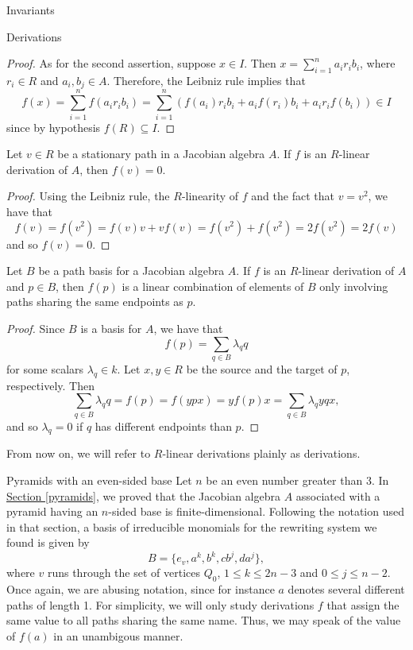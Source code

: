 \begin{chapter}{Invariants}
\begin{section}{Derivations}
\begin{proof}
As for the second assertion, suppose $x\in I$. Then $x=\sum_{i=1}^n a_ir_ib_i$, where $r_i\in R$ and $a_i, b_j\in A$. Therefore, the Leibniz rule implies that
\[f(x) = \sum_{i=1}^n f(a_ir_ib_i)=\sum_{i=1}^n \left(f(a_i)r_ib_i + a_if(r_i)b_i + a_ir_if(b_i)\right)\in I\]
since by hypothesis $f(R)\subseteq I$.
\end{proof}
\begin{obs}\label{derivation-vertices} Let $v\in R$ be a stationary path in a Jacobian algebra $A$. If $f$ is an $R$-linear derivation of $A$, then $f(v)=0$.
\end{obs}
\begin{proof} Using the Leibniz rule, the $R$-linearity of $f$ and the fact that $v=v^2$, we have that
\[f(v)= f(v^2)= f(v)v + vf(v)=f(v^2)+ f(v^2)=2f(v^2)=2f(v)\]
and so $f(v)=0$.
\end{proof}
\begin{obs}\label{endpoints} Let $B$ be a path basis for a Jacobian algebra $A$. If $f$ is an $R$-linear derivation of $A$ and $p\in B$, then $f(p)$ is a linear combination of elements of $B$ only involving paths sharing the same endpoints as $p$.
\end{obs}
\begin{proof} Since $B$ is a basis for $A$, we have that
\[f(p) = \sum_{q\in B} \lambda_q q\]
for some scalars $\lambda_q\in k$. Let $x, y\in R$ be the source and the target of $p$, respectively. Then
\[\sum_{q\in B} \lambda_q q=f(p)=f(ypx) = yf(p)x =\sum_{q\in B} \lambda_q yqx,\]
and so $\lambda_q=0$ if $q$ has different endpoints than $p$.
\end{proof}
From now on, we will refer to $R$-linear derivations plainly as derivations.
\begin{subsection}{Pyramids with an even-sided base}
Let $n$ be an even number greater than 3. In \hyperref[pyramids]{Section \ref*{pyramids}}, we proved that the Jacobian algebra $A$ associated with a pyramid having an $n$-sided base is finite-dimensional. Following the notation used in that section, a basis of irreducible monomials for the rewriting system we found is given by
\[B=\{e_v,a^k,b^k,cb^j, da^j\},\] 
where $v$ runs through the set of vertices $Q_0$, $1\leq k\leq 2n-3$ and $0\leq j\leq n-2$. Once again, we are abusing notation, since for instance $a$ denotes several different paths of length 1. For simplicity, we will only study derivations $f$ that assign the same value to all paths sharing the same name. Thus, we may speak of the value of $f(a)$ in an unambigous manner.


\end{subsection}
\end{section}
\end{chapter}
